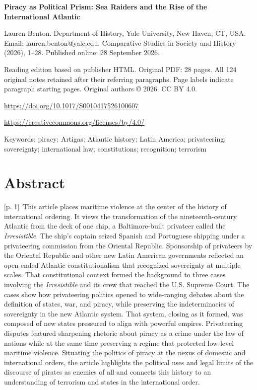 \documentclass[10pt,a4paper]{article}
\begin{document}
{\Large\bfseries Piracy as Political Prism: Sea Raiders and the Rise of the International Atlantic\par}\medskip

Lauren Benton. Department of History, Yale University, New Haven, CT, USA. Email: lauren.benton@yale.edu. Comparative Studies in Society and History (2026), 1–28. Published online: 28 September 2026.\par
Reading edition based on publisher HTML. Original PDF: 28 pages. All 124 original notes retained after their referring paragraphs. Page labels indicate paragraph starting pages. Original authors © 2026. CC BY 4.0.\par
\url{https://doi.org/10.1017/S0010417526100607}\par
\url{https://creativecommons.org/licenses/by/4.0/}\par
Keywords: piracy; Artigas; Atlantic history; Latin America; privateering; sovereignty; international law; constitutions; recognition; terrorism\par\bigskip
{}\section*{Abstract}
{\scriptsize\color{gray} [p. 1]}\ This article places maritime violence at the center of the history of international ordering. It views the transformation of the nineteenth-century Atlantic from the deck of one ship, a Baltimore-built privateer called the \textit{Irresistible.} The ship’s captain seized Spanish and Portuguese shipping under a privateering commission from the Oriental Republic. Sponsorship of privateers by the Oriental Republic and other new Latin American governments reflected an open-ended Atlantic constitutionalism that recognized sovereignty at multiple scales. That constitutional context formed the background to three cases involving the \textit{Irresistible} and its crew that reached the U.S. Supreme Court. The cases show how privateering politics opened to wide-ranging debates about the definition of states, war, and piracy, while preserving the indeterminacies of sovereignty in the new Atlantic system. That system, closing as it formed, was composed of new states pressured to align with powerful empires. Privateering disputes featured sharpening rhetoric about piracy as a crime under the law of nations while at the same time preserving a regime that protected low-level maritime violence. Situating the politics of piracy at the nexus of domestic and international orders, the article highlights the political uses and legal limits of the discourse of pirates as enemies of all and connects this history to an understanding of terrorism and states in the international order.\par
\end{document}
